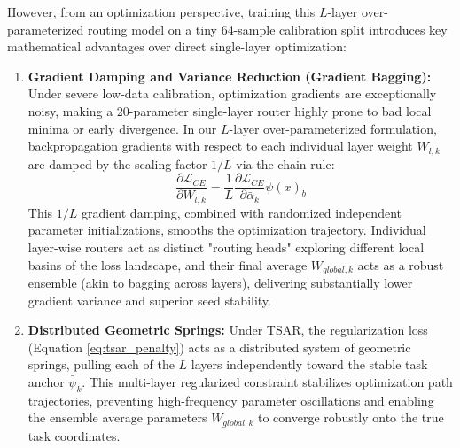 However, from an optimization perspective, training this $L$-layer over-parameterized routing model
on a tiny 64-sample calibration split introduces key mathematical advantages over direct
single-layer optimization:
\begin{enumerate}
  \item \textbf{Gradient Damping and Variance Reduction (Gradient Bagging):} Under severe low-data
calibration, optimization gradients are exceptionally noisy, making a 20-parameter single-layer
router highly prone to bad local minima or early divergence. In our $L$-layer over-parameterized
formulation, backpropagation gradients with respect to each individual layer weight $W_{l, k}$ are
damped by the scaling factor $1/L$ via the chain rule:
  \begin{equation}
  \frac{\partial \mathcal{L}_{CE}}{\partial W_{l, k}} = \frac{1}{L} \frac{\partial
\mathcal{L}_{CE}}{\partial \bar{\alpha}_k} \psi(x)_b
  \label{eq:damped_grad}
  \end{equation}
  This $1/L$ gradient damping, combined with randomized independent parameter initializations,
smooths the optimization trajectory. Individual layer-wise routers act as distinct "routing heads"
exploring different local basins of the loss landscape, and their final average $W_{global, k}$ acts
as a robust ensemble (akin to bagging across layers), delivering substantially lower gradient
variance and superior seed stability.
  \item \textbf{Distributed Geometric Springs:} Under TSAR, the regularization loss (Equation
\ref{eq:tsar_penalty}) acts as a distributed system of geometric springs, pulling each of the $L$
layers independently toward the stable task anchor $\bar{\psi}_k$. This multi-layer regularized
constraint stabilizes optimization path trajectories, preventing high-frequency parameter
oscillations and enabling the ensemble average parameters $W_{global, k}$ to converge robustly onto
the true task coordinates.
\end{enumerate}

